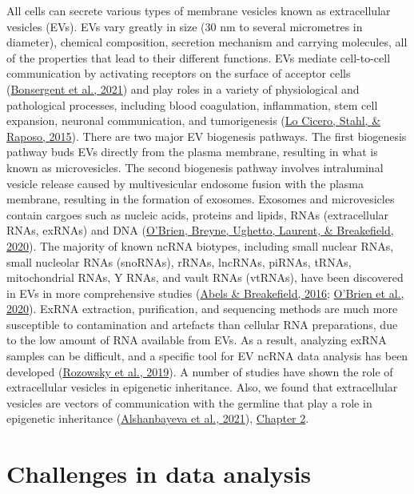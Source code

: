 \documentclass[12pt,twoside]{reedthesis}
\begin{document}
All cells can secrete various types of membrane vesicles known as
extracellular vesicles (EVs). EVs vary greatly in size (30 nm to several
micrometres in diameter), chemical composition, secretion mechanism and
carrying molecules, all of the properties that lead to their different
functions. EVs mediate cell-to-cell communication by activating
receptors on the surface of acceptor cells (\protect\hyperlink{ref-bonsergent2021}{Bonsergent et al., 2021}) and play
roles in a variety of physiological and pathological processes,
including blood coagulation, inflammation, stem cell expansion, neuronal
communication, and tumorigenesis (\protect\hyperlink{ref-locicero2015}{Lo Cicero, Stahl, \& Raposo, 2015}). There are two major EV
biogenesis pathways. The first biogenesis pathway buds EVs directly from
the plasma membrane, resulting in what is known as microvesicles. The
second biogenesis pathway involves intraluminal vesicle release caused
by multivesicular endosome fusion with the plasma membrane, resulting in
the formation of exosomes. Exosomes and microvesicles contain cargoes
such as nucleic acids, proteins and lipids, RNAs (extracellular RNAs,
exRNAs) and DNA (\protect\hyperlink{ref-obrien2020}{O'Brien, Breyne, Ughetto, Laurent, \& Breakefield, 2020}). The majority of known ncRNA biotypes,
including small nuclear RNAs, small nucleolar RNAs (snoRNAs), rRNAs,
lncRNAs, piRNAs, tRNAs,
mitochondrial RNAs, Y RNAs, and vault RNAs (vtRNAs), have been
discovered in EVs in more comprehensive studies (\protect\hyperlink{ref-abels2016}{Abels \& Breakefield, 2016}; \protect\hyperlink{ref-obrien2020}{O'Brien et al., 2020}). ExRNA extraction, purification, and sequencing methods are
much more susceptible to contamination and artefacts than cellular RNA
preparations, due to the low amount of RNA available from EVs. As a
result, analyzing exRNA samples can be difficult, and a specific tool
for EV ncRNA data analysis has been developed (\protect\hyperlink{ref-rozowsky2019}{Rozowsky et al., 2019}). A number
of studies have shown the role of extracellular vesicles in epigenetic
inheritance. Also, we found that extracellular vesicles are vectors of
communication with the germline that play a role in epigenetic
inheritance (\protect\hyperlink{ref-alshanbayeva2021}{Alshanbayeva et al., 2021}), \protect\hyperlink{chapter2}{Chapter 2}.

\hypertarget{challenges-in-data-analysis}{%
\section*{Challenges in data analysis}\label{challenges-in-data-analysis}}
\end{document}
